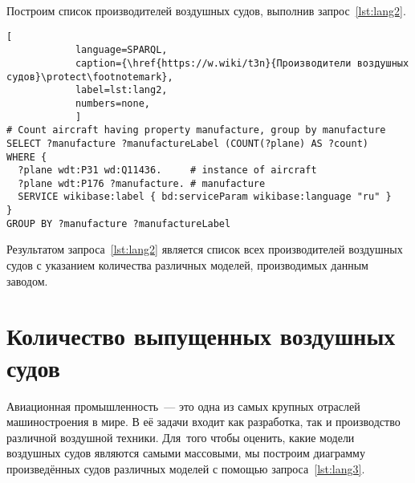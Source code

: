 Построим список производителей воздушных судов, выполнив запрос~\ref{lst:lang2}.

\begin{lstlisting}[ 
            language=SPARQL, 
            caption={\href{https://w.wiki/t3n}{Производители воздушных судов}\protect\footnotemark}, 
            label=lst:lang2, 
            numbers=none,
            ]
# Count aircraft having property manufacture, group by manufacture
SELECT ?manufacture ?manufactureLabel (COUNT(?plane) AS ?count) 
WHERE {
  ?plane wdt:P31 wd:Q11436.     # instance of aircraft
  ?plane wdt:P176 ?manufacture. # manufacture
  SERVICE wikibase:label { bd:serviceParam wikibase:language "ru" }
}
GROUP BY ?manufacture ?manufactureLabel
\end{lstlisting}

Результатом запроса~\ref{lst:lang2} является список всех производителей воздушных судов с указанием количества различных моделей, производимых данным заводом.



\section{Количество выпущенных воздушных судов}%

Авиационная промышленность~--- это одна из самых крупных отраслей машиностроения в мире. 
В её задачи входит как разработка, так и производство различной воздушной техники. 
Для~того чтобы оценить, какие модели воздушных судов являются самыми массовыми, 
мы построим диаграмму произведённых судов различных моделей 
с помощью запроса~\ref{lst:lang3}.

